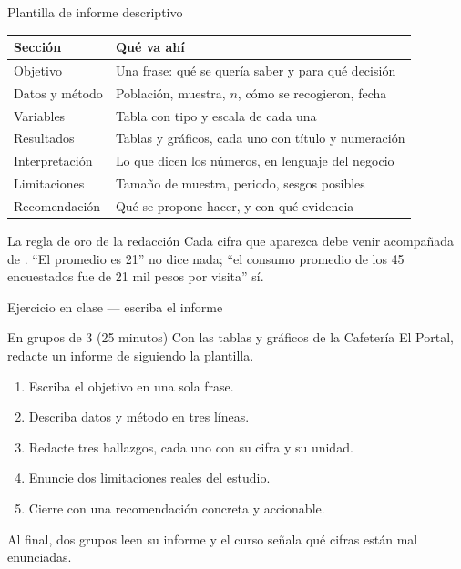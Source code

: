 \documentclass[aspectratio=169,10pt]{beamer}
\begin{document}

\begin{frame}{Plantilla de informe descriptivo}
  \scriptsize
  \begin{center}
  \begin{tabular}{@{}p{2.9cm}p{9.0cm}@{}}
    \toprule
    \textbf{Sección} & \textbf{Qué va ahí} \\
    \midrule
    Objetivo & Una frase: qué se quería saber y para qué decisión \\
    Datos y método & Población, muestra, $n$, cómo se recogieron, fecha \\
    Variables & Tabla con tipo y escala de cada una \\
    Resultados & Tablas y gráficos, cada uno con título y numeración \\
    Interpretación & Lo que dicen los números, en lenguaje del negocio \\
    Limitaciones & Tamaño de muestra, periodo, sesgos posibles \\
    Recomendación & Qué se propone hacer, y con qué evidencia \\
    \bottomrule
  \end{tabular}
  \end{center}

  \vspace{0.1cm}
  \begin{alertblock}{La regla de oro de la redacción}
    \scriptsize
    Cada cifra que aparezca debe venir acompañada de . ``El promedio es 21'' no dice nada;
    ``el consumo promedio de los 45 encuestados fue de 21 mil pesos por
    visita'' sí.
  \end{alertblock}
\end{frame}

\begin{frame}{Ejercicio en clase — escriba el informe}
  \begin{alertblock}{En grupos de 3 (25 minutos)}
    \footnotesize
    Con las tablas y gráficos de la Cafetería El Portal, redacte un informe de
     siguiendo la plantilla.

    \vspace{0.2cm}
    \begin{enumerate}\setlength{\itemsep}{-0.05cm}
      \item Escriba el objetivo en una sola frase.
      \item Describa datos y método en tres líneas.
      \item Redacte tres hallazgos, cada uno con su cifra y su unidad.
      \item Enuncie dos limitaciones reales del estudio.
      \item Cierre con una recomendación concreta y accionable.
    \end{enumerate}

    \vspace{0.15cm}
    Al final, dos grupos leen su informe y el curso señala qué cifras están
    mal enunciadas.
  \end{alertblock}
\end{frame}
\end{document}
